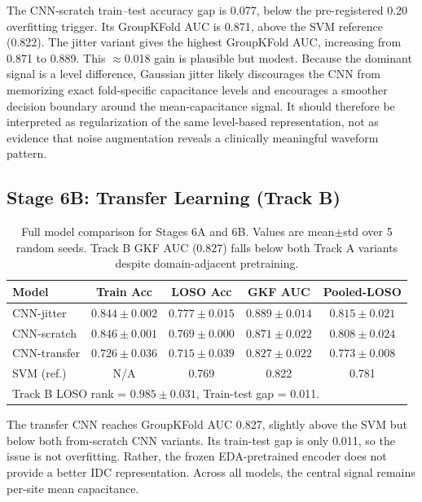 \documentclass[acmtog]{acmart}
\begin{document}
The CNN-scratch train--test accuracy gap is 0.077, below the pre-registered 0.20
overfitting trigger. Its GroupKFold AUC is 0.871, above the SVM reference (0.822).
The jitter variant gives the highest GroupKFold AUC, increasing from 0.871 to
0.889. This $\approx$0.018 gain is plausible but modest. Because the dominant
signal is a level difference, Gaussian jitter likely discourages the CNN from
memorizing exact fold-specific capacitance levels and encourages a smoother
decision boundary around the mean-capacitance signal. It should therefore be
interpreted as regularization of the same level-based representation, not as
evidence that noise augmentation reveals a clinically meaningful waveform
pattern.

\subsection{Stage 6B: Transfer Learning (Track B)}\label{sec:stage6b_results}


\begin{table}[t]
  \caption{Full model comparison for Stages 6A and 6B. Values are mean$\pm$std
           over 5 random seeds.  Track B GKF AUC (0.827) falls below both
           Track A variants despite domain-adjacent pretraining.}
  \label{tab:cnn_trackB}
  \centering\small
  \begin{tabular}{lcccc}
    \toprule
    Model & Train Acc & LOSO Acc & GKF AUC & Pooled-LOSO \\
    \midrule
    CNN-jitter
      & $0.844 \pm 0.002$
      & $0.777 \pm 0.015$
      & $\mathbf{0.889} \pm 0.014$
      & $0.815 \pm 0.021$ \\
    CNN-scratch
      & $0.846 \pm 0.001$
      & $0.769 \pm 0.000$
      & $0.871 \pm 0.022$
      & $0.808 \pm 0.024$ \\
    CNN-transfer
      & $0.726 \pm 0.036$
      & $0.715 \pm 0.039$
      & $0.827 \pm 0.022$
      & $0.773 \pm 0.008$ \\
    SVM (ref.)
      & N/A
      & 0.769
      & 0.822
      & 0.781 \\
    \bottomrule
    \multicolumn{5}{l}{\footnotesize Track B LOSO rank = $0.985 \pm 0.031$, Train-test gap = 0.011.} \\
  \end{tabular}
\end{table}

The transfer CNN reaches GroupKFold AUC 0.827, slightly above the SVM but below
both from-scratch CNN variants. Its train-test gap is only 0.011, so the issue is
not overfitting. Rather, the frozen EDA-pretrained encoder does not provide a better
IDC representation. Across all models, the central signal remains per-site mean
capacitance.
\end{document}
